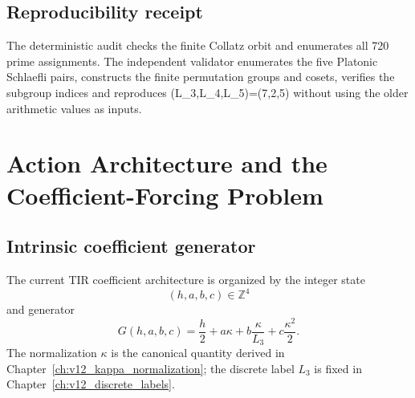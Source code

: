 \documentclass[11pt,a4paper,twoside]{book}
\def\({}%
\def\){}%
\theoremstyle{definition}
\begin{document}
\section{Reproducibility receipt}

The deterministic audit
checks the finite Collatz orbit and enumerates all \(720\) prime assignments.
The independent validator
enumerates the five Platonic Schlaefli pairs, constructs the finite permutation
groups and cosets, verifies the subgroup indices and reproduces
\((L_3,L_4,L_5)=(7,2,5)\) without using the older arithmetic values as inputs.

\clearpage

\chapter[Action Architecture and Coefficient Forcing]{Action Architecture and the Coefficient-Forcing Problem}
\label{ch:v12_action_coefficients}

\section{Intrinsic coefficient generator}
The current TIR coefficient architecture is organized by the integer state
\begin{equation}
\boxed{(h,a,b,c)\in\mathbb Z^4}
\label{eq:v12-coefficient-state}
\end{equation}
and generator
\begin{equation}
\boxed{
G(h,a,b,c)
=\frac h2
+a\kappa
+b\frac{\kappa}{L_3}
+c\frac{\kappa^2}{2}.
}
\label{eq:v12-coefficient-generator}
\end{equation}
The normalization $\kappa$ is the canonical quantity derived in
Chapter~\ref{ch:v12_kappa_normalization}; the discrete label $L_3$ is fixed in
Chapter~\ref{ch:v12_discrete_labels}.
\end{document}
